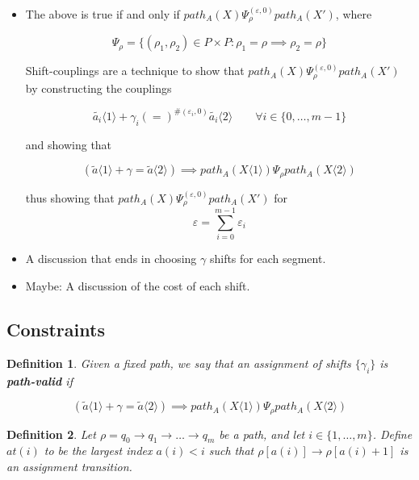 \documentclass{article}
\newtheorem{definition}{Definition}[section]
\renewcommand{\epsilon}{\varepsilon}
\newcommand{\1}{\langle 1 \rangle}
\newcommand{\2}{\langle 2 \rangle}
\begin{document}
\begin{itemize}
    \item The above is true if and only if $path_A(X) \Psi_\rho^{(\epsilon, 0)} path_A(X')$, where

    \[\Psi_\rho = \{(\rho_1, \rho_2) \in P \times P : \rho_1 = \rho \implies \rho_2 = \rho \} \]
    
    Shift-couplings are a technique to show that $path_A(X) \Psi_\rho^{(\epsilon, 0)} path_A(X')$ by constructing the couplings
    
    \[\tilde{a_i} \1 + \gamma_i (=)^{\#(\epsilon_i, 0)} \tilde{a_i} \2 \qquad \forall i \in \{0, \dots, m - 1\}\]

    and showing that 

    \[(\tilde{a} \1 + \gamma = \tilde{a} \2) \implies path_A(X \1) \Psi_\rho path_A(X \2)\]

    thus showing that $path_A(X) \Psi_\rho^{(\epsilon, 0)} path_A(X')$ for \[\epsilon = \sum_{i = 0}^{m - 1} \epsilon_i\]
    
    
    \item A discussion that ends in choosing $\gamma$ shifts for each segment. 
    \item Maybe: A discussion of the cost of each shift.    
\end{itemize}


\subsection{Constraints} 

\begin{definition}
    
Given a fixed path, we say that an assignment of shifts $\{\gamma_i\}$ is \textbf{path-valid} if

\[(\tilde{a} \1 + \gamma = \tilde{a} \2) \implies path_A(X \1) \Psi_\rho path_A(X \2)\]

\end{definition}

\begin{definition}
    Let $\rho = q_0 \to q_1 \to \dots \to q_m$ be a path, and let $i \in \{1, \dots, m\}$. Define $at(i)$ to be the largest index $a(i) < i$ such that $\rho[a(i)] \to \rho[a(i) + 1]$ is an assignment transition.  
\end{definition}
\end{document}
